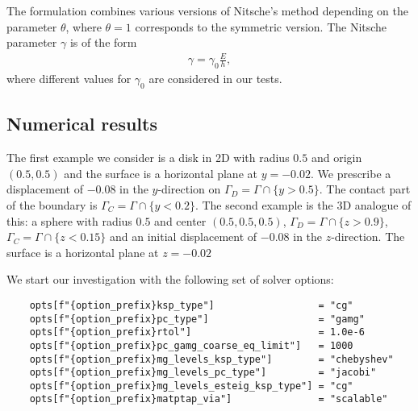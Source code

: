 \documentclass[12pt]{article}
\begin{document}
The formulation combines various versions of Nitsche's method depending on the parameter $\theta$, where $\theta = 1$ corresponds to the symmetric version.
The Nitsche parameter $\gamma$ is of the form 
\begin{align}
    \gamma = \gamma_0 \frac{E}{h},
\end{align}
where different values for $\gamma_0$ are considered in our tests.
\subsection{Numerical results}
The first example we consider is a disk in 2D with radius $0.5$ and origin $(0.5, 0.5)$ 
and the surface is a horizontal plane at $y = -0.02$. We prescribe a displacement of $-0.08$ in the $y$-direction
on $\Gamma_D = \Gamma \cap \{y > 0.5 \}$. The contact part of the boundary is 
$\Gamma_C  = \Gamma \cap \{y < 0.2 \}$. The second example is the 3D analogue of this: a sphere
with radius $0.5$ and center $(0.5, 0.5, 0.5)$, $\Gamma_D = \Gamma \cap \{z > 0.9\}$, $\Gamma_C = \Gamma \cap \{z< 0.15\}$ and an initial displacement of 
$-0.08$ in the $z$-direction. The surface is a horizontal plane at $z = -0.02$


    We start our investigation with the following set of solver options:
\begin{verbatim}
    opts[f"{option_prefix}ksp_type"]                  = "cg"
    opts[f"{option_prefix}pc_type"]                   = "gamg"
    opts[f"{option_prefix}rtol"]                      = 1.0e-6
    opts[f"{option_prefix}pc_gamg_coarse_eq_limit"]   = 1000
    opts[f"{option_prefix}mg_levels_ksp_type"]        = "chebyshev"
    opts[f"{option_prefix}mg_levels_pc_type"]         = "jacobi"
    opts[f"{option_prefix}mg_levels_esteig_ksp_type"] = "cg"
    opts[f"{option_prefix}matptap_via"]               = "scalable"
\end{verbatim}
\end{document}
